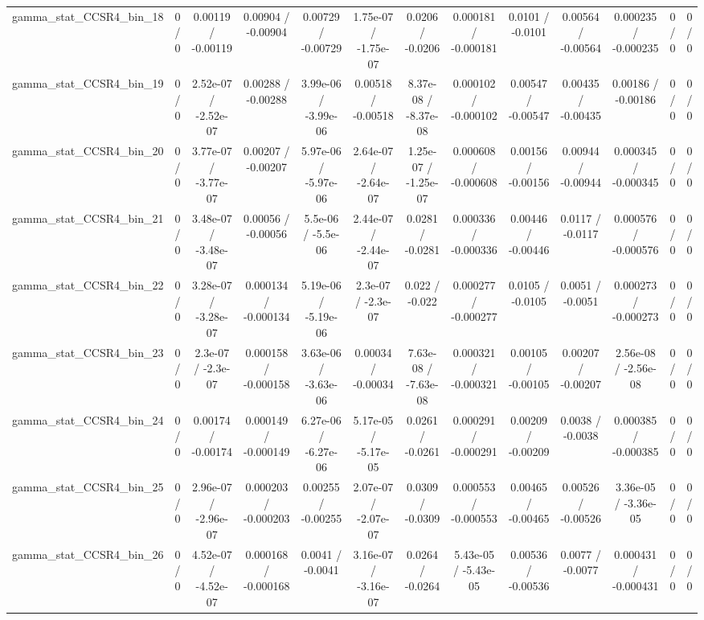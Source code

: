 \documentclass[10pt]{article}
\begin{document}
\begin{table}[htbp]
\begin{center}
\begin{tabular}{|c|c|c|c|c|c|c|c|c|c|c|c|c|}
  gamma_stat_CCSR4_bin_18 & 0 / 0 & 0.00119 / -0.00119 & 0.00904 / -0.00904 & 0.00729 / -0.00729 & 1.75e-07 / -1.75e-07 & 0.0206 / -0.0206 & 0.000181 / -0.000181 & 0.0101 / -0.0101 & 0.00564 / -0.00564 & 0.000235 / -0.000235 & 0 / 0 & 0 / 0 \\ 
  gamma_stat_CCSR4_bin_19 & 0 / 0 & 2.52e-07 / -2.52e-07 & 0.00288 / -0.00288 & 3.99e-06 / -3.99e-06 & 0.00518 / -0.00518 & 8.37e-08 / -8.37e-08 & 0.000102 / -0.000102 & 0.00547 / -0.00547 & 0.00435 / -0.00435 & 0.00186 / -0.00186 & 0 / 0 & 0 / 0 \\ 
  gamma_stat_CCSR4_bin_20 & 0 / 0 & 3.77e-07 / -3.77e-07 & 0.00207 / -0.00207 & 5.97e-06 / -5.97e-06 & 2.64e-07 / -2.64e-07 & 1.25e-07 / -1.25e-07 & 0.000608 / -0.000608 & 0.00156 / -0.00156 & 0.00944 / -0.00944 & 0.000345 / -0.000345 & 0 / 0 & 0 / 0 \\ 
  gamma_stat_CCSR4_bin_21 & 0 / 0 & 3.48e-07 / -3.48e-07 & 0.00056 / -0.00056 & 5.5e-06 / -5.5e-06 & 2.44e-07 / -2.44e-07 & 0.0281 / -0.0281 & 0.000336 / -0.000336 & 0.00446 / -0.00446 & 0.0117 / -0.0117 & 0.000576 / -0.000576 & 0 / 0 & 0 / 0 \\ 
  gamma_stat_CCSR4_bin_22 & 0 / 0 & 3.28e-07 / -3.28e-07 & 0.000134 / -0.000134 & 5.19e-06 / -5.19e-06 & 2.3e-07 / -2.3e-07 & 0.022 / -0.022 & 0.000277 / -0.000277 & 0.0105 / -0.0105 & 0.0051 / -0.0051 & 0.000273 / -0.000273 & 0 / 0 & 0 / 0 \\ 
  gamma_stat_CCSR4_bin_23 & 0 / 0 & 2.3e-07 / -2.3e-07 & 0.000158 / -0.000158 & 3.63e-06 / -3.63e-06 & 0.00034 / -0.00034 & 7.63e-08 / -7.63e-08 & 0.000321 / -0.000321 & 0.00105 / -0.00105 & 0.00207 / -0.00207 & 2.56e-08 / -2.56e-08 & 0 / 0 & 0 / 0 \\ 
  gamma_stat_CCSR4_bin_24 & 0 / 0 & 0.00174 / -0.00174 & 0.000149 / -0.000149 & 6.27e-06 / -6.27e-06 & 5.17e-05 / -5.17e-05 & 0.0261 / -0.0261 & 0.000291 / -0.000291 & 0.00209 / -0.00209 & 0.0038 / -0.0038 & 0.000385 / -0.000385 & 0 / 0 & 0 / 0 \\ 
  gamma_stat_CCSR4_bin_25 & 0 / 0 & 2.96e-07 / -2.96e-07 & 0.000203 / -0.000203 & 0.00255 / -0.00255 & 2.07e-07 / -2.07e-07 & 0.0309 / -0.0309 & 0.000553 / -0.000553 & 0.00465 / -0.00465 & 0.00526 / -0.00526 & 3.36e-05 / -3.36e-05 & 0 / 0 & 0 / 0 \\ 
  gamma_stat_CCSR4_bin_26 & 0 / 0 & 4.52e-07 / -4.52e-07 & 0.000168 / -0.000168 & 0.0041 / -0.0041 & 3.16e-07 / -3.16e-07 & 0.0264 / -0.0264 & 5.43e-05 / -5.43e-05 & 0.00536 / -0.00536 & 0.0077 / -0.0077 & 0.000431 / -0.000431 & 0 / 0 & 0 / 0 \\ 

\end{tabular}
\end{center}
\end{table}
\end{document}
